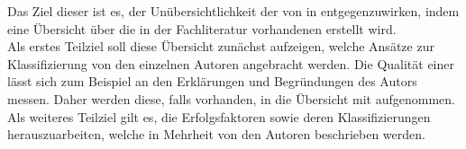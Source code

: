 Das Ziel dieser \BA ist es, der Unübersichtlichkeit der \KAS von \EF in 
\ISPS entgegenzuwirken, indem eine Übersicht über die in der Fachliteratur vorhandenen \KAS erstellt wird.\\
Als erstes Teilziel soll diese Übersicht zunächst aufzeigen, welche Ansätze zur Klassifizierung von den einzelnen Autoren angebracht werden.
Die Qualität einer \KA lässt sich zum Beispiel an den Erklärungen und Begründungen des Autors messen. Daher werden diese, falls vorhanden, in die
Übersicht mit aufgenommen.
Als weiteres Teilziel gilt es, die Erfolgsfaktoren sowie deren Klassifizierungen herauszuarbeiten, welche in Mehrheit von den Autoren beschrieben werden. 